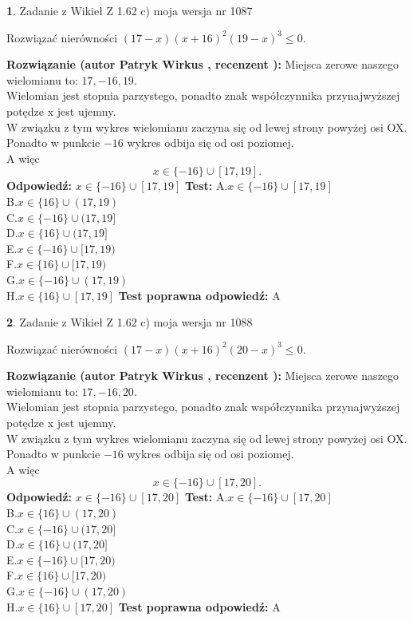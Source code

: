 \documentclass[12pt, a4paper]{article}
\theoremstyle{definition} %
\newtheorem{zad}{}
\newcommand{\zadStart}[1]{\begin{zad}#1\newline}
\newcommand{\zadStop}{\end{zad}}
\newcommand{\rozwStart}[2]{\noindent \textbf{Rozwiązanie (autor #1 , recenzent #2): }\newline}
\newcommand{\rozwStop}{\newline}
\newcommand{\odpStart}{\noindent \textbf{Odpowiedź:}\newline}
\newcommand{\odpStop}{\newline}
\newcommand{\testStart}{\noindent \textbf{Test:}\newline}
\newcommand{\testStop}{\newline}
\newcommand{\kluczStart}{\noindent \textbf{Test poprawna odpowiedź:}\newline}
\newcommand{\kluczStop}{\newline}
\begin{document}
\zadStart{Zadanie z Wikieł Z 1.62 c) moja wersja nr 1087}

Rozwiązać nierówności $(17-x)(x+16)^{2}(19-x)^{3}\le0$.
\zadStop
\rozwStart{Patryk Wirkus}{}
Miejsca zerowe naszego wielomianu to: $17, -16, 19$.\\
Wielomian jest stopnia parzystego, ponadto znak współczynnika przy\linebreak najwyższej potędze x jest ujemny.\\ W związku z tym wykres wielomianu zaczyna się od lewej strony powyżej osi OX.\\
Ponadto w punkcie $-16$ wykres odbija się od osi poziomej.\\
A więc $$x \in \{-16\} \cup [17,19].$$
\rozwStop
\odpStart
$x \in \{-16\} \cup [17,19]$
\odpStop
\testStart
A.$x \in \{-16\} \cup [17,19]$\\
B.$x \in \{16\} \cup (17,19)$\\
C.$x \in \{-16\} \cup (17,19]$\\
D.$x \in \{16\} \cup (17,19]$\\
E.$x \in \{-16\} \cup [17,19)$\\
F.$x \in \{16\} \cup [17,19)$\\
G.$x \in \{-16\} \cup (17,19)$\\
H.$x \in \{16\} \cup [17,19]$
\testStop
\kluczStart
A
\kluczStop



\zadStart{Zadanie z Wikieł Z 1.62 c) moja wersja nr 1088}

Rozwiązać nierówności $(17-x)(x+16)^{2}(20-x)^{3}\le0$.
\zadStop
\rozwStart{Patryk Wirkus}{}
Miejsca zerowe naszego wielomianu to: $17, -16, 20$.\\
Wielomian jest stopnia parzystego, ponadto znak współczynnika przy\linebreak najwyższej potędze x jest ujemny.\\ W związku z tym wykres wielomianu zaczyna się od lewej strony powyżej osi OX.\\
Ponadto w punkcie $-16$ wykres odbija się od osi poziomej.\\
A więc $$x \in \{-16\} \cup [17,20].$$
\rozwStop
\odpStart
$x \in \{-16\} \cup [17,20]$
\odpStop
\testStart
A.$x \in \{-16\} \cup [17,20]$\\
B.$x \in \{16\} \cup (17,20)$\\
C.$x \in \{-16\} \cup (17,20]$\\
D.$x \in \{16\} \cup (17,20]$\\
E.$x \in \{-16\} \cup [17,20)$\\
F.$x \in \{16\} \cup [17,20)$\\
G.$x \in \{-16\} \cup (17,20)$\\
H.$x \in \{16\} \cup [17,20]$
\testStop
\kluczStart
A
\kluczStop
\end{document}

